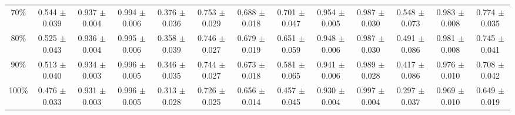 \documentclass[11pt]{article}
\begin{document}
\begin{table}[ht]
{\begin{tabular}{ccccccccccccc}
70\% & 0.544 $\pm$ 0.039 & 0.937 $\pm$ 0.004 & 0.994 $\pm$ 0.006 & 0.376 $\pm$ 0.036 & 0.753 $\pm$ 0.029 & 0.688 $\pm$ 0.018 & 0.701 $\pm$ 0.047 & 0.954 $\pm$ 0.005 & 0.987 $\pm$ 0.030 & 0.548 $\pm$ 0.073 & 0.983 $\pm$ 0.008 & 0.774 $\pm$ 0.035 \\
80\% & 0.525 $\pm$ 0.043 & 0.936 $\pm$ 0.004 & 0.995 $\pm$ 0.006 & 0.358 $\pm$ 0.039 & 0.746 $\pm$ 0.027 & 0.679 $\pm$ 0.019 & 0.651 $\pm$ 0.059 & 0.948 $\pm$ 0.006 & 0.987 $\pm$ 0.030 & 0.491 $\pm$ 0.086 & 0.981 $\pm$ 0.008 & 0.745 $\pm$ 0.041 \\
90\% & 0.513 $\pm$ 0.040 & 0.934 $\pm$ 0.003 & 0.996 $\pm$ 0.005 & 0.346 $\pm$ 0.035 & 0.744 $\pm$ 0.027 & 0.673 $\pm$ 0.018 & 0.581 $\pm$ 0.065 & 0.941 $\pm$ 0.006 & 0.989 $\pm$ 0.028 & 0.417 $\pm$ 0.086 & 0.976 $\pm$ 0.010 & 0.708 $\pm$ 0.042 \\
100\% & 0.476 $\pm$ 0.033 & 0.931 $\pm$ 0.003 & 0.996 $\pm$ 0.005 & 0.313 $\pm$ 0.028 & 0.726 $\pm$ 0.025 & 0.656 $\pm$ 0.014 & 0.457 $\pm$ 0.045 & 0.930 $\pm$ 0.004 & 0.997 $\pm$ 0.004 & 0.297 $\pm$ 0.037 & 0.969 $\pm$ 0.010 & 0.649 $\pm$ 0.019 \\
\bottomrule
\end{tabular}
}
\end{table}

\clearpage
\end{document}

